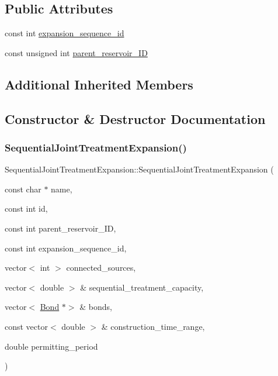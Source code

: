 \subsection*{Public Attributes}
\begin{DoxyCompactItemize}
\item 
const int \mbox{\hyperlink{classSequentialJointTreatmentExpansion_adeaf6ba2bcfc4c024e332764144e3021}{expansion\+\_\+sequence\+\_\+id}}
\item 
const unsigned int \mbox{\hyperlink{classSequentialJointTreatmentExpansion_a43b9e27138606bbbf8e5ef0279232a0a}{parent\+\_\+reservoir\+\_\+\+ID}}
\end{DoxyCompactItemize}
\subsection*{Additional Inherited Members}


\subsection{Constructor \& Destructor Documentation}
\mbox{\label{classSequentialJointTreatmentExpansion_ad3ca28eaaa041be6ebbd0a4593d5c9ab}} 
\subsubsection{\texorpdfstring{Sequential\+Joint\+Treatment\+Expansion()}{SequentialJointTreatmentExpansion()}\hspace{0.1cm}{\footnotesize\ttfamily [1/2]}}
{\footnotesize\ttfamily Sequential\+Joint\+Treatment\+Expansion\+::\+Sequential\+Joint\+Treatment\+Expansion (\begin{DoxyParamCaption}\item[{const char $\ast$}]{name,  }\item[{const int}]{id,  }\item[{const int}]{parent\+\_\+reservoir\+\_\+\+ID,  }\item[{const int}]{expansion\+\_\+sequence\+\_\+id,  }\item[{vector$<$ int $>$}]{connected\+\_\+sources,  }\item[{vector$<$ double $>$ \&}]{sequential\+\_\+treatment\+\_\+capacity,  }\item[{vector$<$ \mbox{\hyperlink{classBond}{Bond}} $\ast$$>$ \&}]{bonds,  }\item[{const vector$<$ double $>$ \&}]{construction\+\_\+time\+\_\+range,  }\item[{double}]{permitting\+\_\+period }\end{DoxyParamCaption})}


